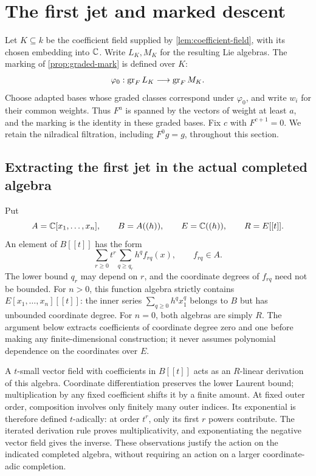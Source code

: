 \section{The first jet and marked descent}\label{sec:descent}

Let $K\subseteq k$ be the coefficient field supplied by
\cref{lem:coefficient-field}, with its chosen embedding into $\mathbb C$.
Write $L_K,M_K$ for the resulting Lie algebras.
The marking of \cref{prop:graded-mark} is defined over $K$:
\[
 \varphi_0:\operatorname{gr}_FL_K\longrightarrow\operatorname{gr}_FM_K.
\]
Choose adapted bases whose graded classes correspond under $\varphi_0$, and
write $w_i$ for their common weights. Thus $F^a$ is spanned by the vectors
of weight at least $a$, and the marking is the identity in these graded
bases. Fix $c$ with $F^{c+1}=0$. We retain the nilradical filtration,
including $F^0g=g$, throughout this section.

\subsection{Extracting the first jet in the actual completed algebra}

Put
\[
 A=\mathbb C[x_1,\ldots,x_n],\qquad B=A((h)),\qquad
 E=\mathbb C((h)),\qquad R=E[[t]].
\]
An element of $B[[t]]$ has the form
\[
 \sum_{r\geq0}t^r\sum_{q\geq q_r}h^q f_{rq}(x),
 \qquad f_{rq}\in A.
\]
The lower bound $q_r$ may depend on $r$, and the coordinate degrees of
$f_{rq}$ need not be bounded. For $n>0$, this function algebra strictly
contains $E[x_1,\ldots,x_n][[t]]$: the inner series
$\sum_{q\geq0}h^q x_1^q$ belongs to $B$ but has unbounded
coordinate degree. For $n=0$, both algebras are simply $R$.
The argument below extracts coefficients of coordinate
degree zero and one before making any finite-dimensional construction;
it never assumes polynomial dependence on the coordinates over $E$.

A $t$-small vector field with coefficients in $B[[t]]$ acts as an
$R$-linear derivation of this algebra. Coordinate differentiation preserves
the lower Laurent bound; multiplication by any fixed coefficient shifts
it by a finite amount. At fixed outer order, composition involves only
finitely many outer indices. Its exponential is therefore defined
$t$-adically: at order $t^r$, only its first $r$ powers contribute.
The iterated derivation rule proves multiplicativity, and exponentiating
the negative vector field gives the inverse. These observations justify
the action on the indicated completed algebra, without requiring an
action on a larger coordinate-adic completion.

